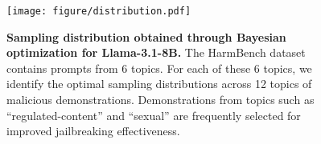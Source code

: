 \begin{figure}[ht]
    \centering %

    {\texttt{[image: figure/distribution.pdf]}}
    \vspace{-0.65cm}
    \caption{\textbf{Sampling distribution obtained through Bayesian optimization for Llama-3.1-8B.} The HarmBench dataset contains prompts from 6 topics. For each of these 6 topics, we identify the optimal sampling distributions across 12 topics of malicious demonstrations. Demonstrations from topics such as ``regulated-content'' and ``sexual'' are frequently selected for improved jailbreaking effectiveness.}
    \label{fig:distribution}
    \vspace{-0.6cm}
\end{figure}



